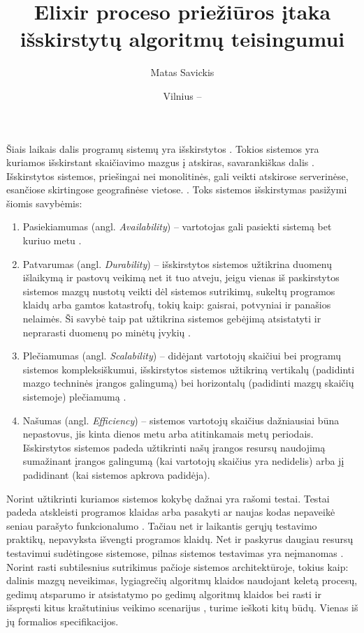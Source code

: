 \documentclass{VUMIFPSmagistrinis}
\title{Elixir proceso priežiūros įtaka išskirstytų algoritmų teisingumui}
\author{Matas Savickis}
\date{Vilnius – \the\year}
\begin{document}

\maketitle

\tableofcontents



		Šiais laikais dalis programų sistemų yra išskirstytos \cite{mcr}. 
		Tokios sistemos yra kuriamos išskirstant skaičiavimo mazgus į atskiras, savarankiškas dalis \cite{coulouris2005distributed}.
		Išskirstytos sistemos, priešingai nei monolitinės, gali veikti atskirose serverinėse, esančiose skirtingose geografinėse vietose. \cite{shirriff2006method}.
		Toks sistemos išskirstymas pasižymi šiomis savybėmis:

		\begin{enumerate}
			\item{Pasiekiamumas (angl. {\it Availability}) -- vartotojas gali pasiekti sistemą bet kuriuo metu \cite{180327}.}
			\item{Patvarumas (angl. {\it Durability}) -- išskirstytos sistemos užtikrina duomenų išlaikymą ir pastovų veikimą net it tuo atveju, jeigu vienas iš paskirstytos sistemos mazgų nustotų veikti dėl sistemos sutrikimų, sukeltų programos klaidų arba gamtos katastrofų, tokių kaip: gaisrai, potvyniai ir panašios nelaimės. Ši savybė taip pat užtikrina sistemos gebėjimą atsistatyti ir neprarasti duomenų po minėtų įvykių \cite{5470366}.}
			\item{Plečiamumas (angl. {\it Scalability}) -- didėjant vartotojų skaičiui bei programų sistemos kompleksiškumui, išskirstytos sistemos užtikriną vertikalų (padidinti mazgo techninės įrangos galingumą) bei horizontalų (padidinti mazgų skaičių sistemoje) plečiamumą \cite{862209}.}
			\item{Našumas (angl. {\it Efficiency}) -- sistemos vartotojų skaičius dažniausiai būna nepastovus, jis kinta dienos metu arba atitinkamais metų periodais. Išskirstytos sistemos padeda užtikrinti našų įrangos resursų naudojimą sumažinant įrangos galingumą (kai vartotojų skaičius yra nedidelis) arba jį padidinant (kai sistemos apkrova padidėja).}
		\end{enumerate}

		Norint užtikrinti kuriamos sistemos kokybę dažnai yra rašomi testai. 
		Testai padeda atskleisti programos klaidas arba pasakyti ar naujas kodas nepaveikė seniau parašyto funkcionalumo \cite{819971}.
		Tačiau net ir laikantis gerųjų testavimo praktikų, nepavyksta išvengti programos klaidų.
		Net ir paskyrus daugiau resursų testavimui sudėtingose sistemose, pilnas sistemos testavimas yra neįmanomas \cite{sullivan2004software}.
		Norint rasti subtilesnius sutrikimus pačioje sistemos architektūroje, tokius kaip: dalinis mazgų neveikimas, lygiagrečių algoritmų klaidos naudojant keletą procesų, gedimų atsparumo ir atsistatymo po gedimų algoritmų klaidos bei rasti ir išspręsti kitus kraštutinius veikimo scenarijus \cite{newcombe2014use}, turime ieškoti kitų būdų. 
		Vienas iš jų formalios specifikacijos.
\end{document}
